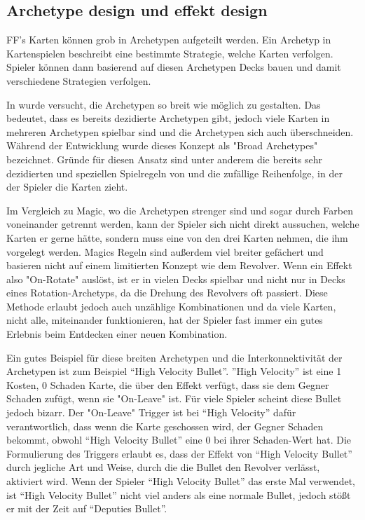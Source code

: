 \subsection{Archetype design und effekt design}\label{subsec:placementMatters}

FF's Karten können grob in Archetypen aufgeteilt werden. Ein Archetyp in Kartenspielen beschreibt eine bestimmte Strategie, welche Karten verfolgen.
Spieler können dann basierend auf diesen Archetypen Decks bauen und damit verschiedene Strategien verfolgen.\cite{whatIsAnArchetype}


In \FF wurde versucht, die Archetypen so breit wie möglich zu gestalten. Das bedeutet, dass es bereits dezidierte Archetypen gibt,
jedoch viele Karten in mehreren Archetypen spielbar sind und die Archetypen sich auch überschneiden.
Während der Entwicklung wurde dieses Konzept als "Broad Archetypes" bezeichnet. Gründe für diesen Ansatz sind unter anderem
die bereits sehr dezidierten und speziellen Spielregeln von \FF und die zufällige Reihenfolge, in der der Spieler die Karten zieht.


Im Vergleich zu Magic, wo die Archetypen strenger sind und sogar durch Farben voneinander getrennt werden,
kann der Spieler sich nicht direkt aussuchen, welche Karten er gerne hätte, sondern muss eine von den drei Karten nehmen,
die ihm vorgelegt werden. Magics Regeln sind außerdem viel breiter gefächert und basieren nicht auf einem limitierten
Konzept wie dem Revolver. Wenn ein Effekt also "On-Rotate" auslöst, ist er in vielen Decks spielbar und nicht nur in Decks
eines Rotation-Archetyps, da die Drehung des Revolvers oft passiert. Diese Methode erlaubt jedoch auch unzählige
Kombinationen und da viele Karten, nicht alle, miteinander funktionieren, hat der Spieler fast immer ein gutes Erlebnis
beim Entdecken einer neuen Kombination.\cite{magicarena}


Ein gutes Beispiel für diese breiten Archetypen und die Interkonnektivität der Archetypen ist zum Beispiel “High Velocity Bullet”.
”High Velocity” ist eine 1 Kosten, 0 Schaden Karte, die über den Effekt verfügt, dass sie dem Gegner Schaden zufügt, wenn sie "On-Leave" ist.
Für viele Spieler scheint diese Bullet jedoch bizarr. Der "On-Leave" Trigger ist bei “High Velocity” dafür verantwortlich,
dass wenn die Karte geschossen wird, der Gegner Schaden bekommt, obwohl “High Velocity Bullet” eine 0 bei ihrer Schaden-Wert hat.
Die Formulierung des Triggers erlaubt es, dass der Effekt von “High Velocity Bullet” durch jegliche Art und Weise, durch
die die Bullet den Revolver verlässt, aktiviert wird. Wenn der Spieler “High Velocity Bullet” das erste Mal verwendet,
ist “High Velocity Bullet” nicht viel anders als eine normale Bullet, jedoch stößt er mit der Zeit auf “Deputies Bullet”.


